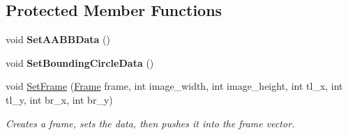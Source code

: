 \subsection*{Protected Member Functions}
\begin{DoxyCompactItemize}
\item 
\hypertarget{classAnimation_a38c9de97a39eae141b72efe2f7930e03}{
void {\bfseries SetAABBData} ()}
\label{classAnimation_a38c9de97a39eae141b72efe2f7930e03}

\item 
\hypertarget{classAnimation_a2ee32acf6b12d43dd33af796ac00c7cc}{
void {\bfseries SetBoundingCircleData} ()}
\label{classAnimation_a2ee32acf6b12d43dd33af796ac00c7cc}

\item 
\hypertarget{classAnimation_a0b311c52647a7349df1d1b2ece7ad8cf}{
void \hyperlink{classAnimation_a0b311c52647a7349df1d1b2ece7ad8cf}{SetFrame} (\hyperlink{structFrame}{Frame} frame, int image\_\-width, int image\_\-height, int tl\_\-x, int tl\_\-y, int br\_\-x, int br\_\-y)}
\label{classAnimation_a0b311c52647a7349df1d1b2ece7ad8cf}

\begin{DoxyCompactList}\small\item\em Creates a frame, sets the data, then pushes it into the frame vector. \item\end{DoxyCompactList}\end{DoxyCompactItemize}
